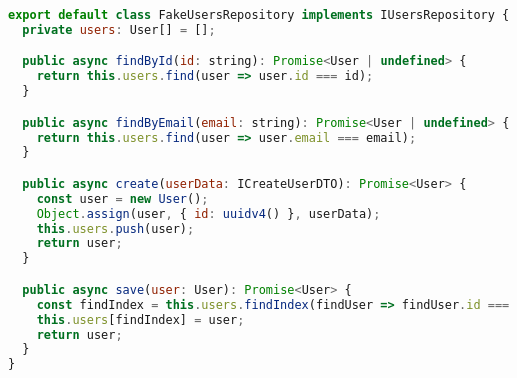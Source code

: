 \begin{lstlisting}[language=JavaScript, caption={FakeUsersRepository.ts},captionpos=b, label=alg:fakeusersrepository]
export default class FakeUsersRepository implements IUsersRepository {
  private users: User[] = [];

  public async findById(id: string): Promise<User | undefined> {
    return this.users.find(user => user.id === id);
  }

  public async findByEmail(email: string): Promise<User | undefined> {
    return this.users.find(user => user.email === email);
  }

  public async create(userData: ICreateUserDTO): Promise<User> {
    const user = new User();
    Object.assign(user, { id: uuidv4() }, userData);
    this.users.push(user);
    return user;
  }

  public async save(user: User): Promise<User> {
    const findIndex = this.users.findIndex(findUser => findUser.id === user.id);
    this.users[findIndex] = user;
    return user;
  }
}
\end{lstlisting}
